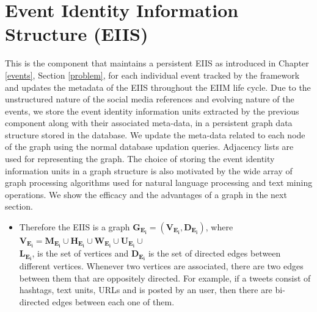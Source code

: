 \section{Event Identity Information Structure (EIIS)}
This is the component that maintains a persistent EIIS as introduced in Chapter \ref{events}, Section \ref{problem}, for each individual event tracked by the framework and updates the metadata of the EIIS throughout the EIIM life cycle. Due to the unstructured nature of the social media references and evolving nature of the events, we store the event identity information units extracted by the previous component along with their associated meta-data, in a persistent graph data structure stored in the database. We update the meta-data related to each node of the graph using the normal database updation queries. Adjacency lists are used for representing the graph. The choice of storing the event identity information units in a graph structure is also motivated by the wide array of graph processing algorithms used for natural language processing and text mining operations. We show the efficacy and the advantages of a graph in the next section. 

\begin{itemize}
\item Therefore the EIIS is a graph $\mathbf{G_{E_{i}} = (V_{E_{i}},D_{E_{i}})}$, where $\mathbf{V_{E_{i}} = M_{E_{i}} \cup H_{E_{i}} \cup W_{E_{i}} \cup U_{E_{i}} \cup}$ \\  $\mathbf{L_{E_{i}}}$, is the set of vertices and $\mathbf{D_{E_{i}}}$ is the set of directed edges between different vertices. Whenever two vertices are associated, there are two edges between them that are oppositely directed. For example, if a tweets consist of hashtags, text units, URLs and is posted by an user, then there are bi-directed edges between each one of them. 
\end{itemize}




